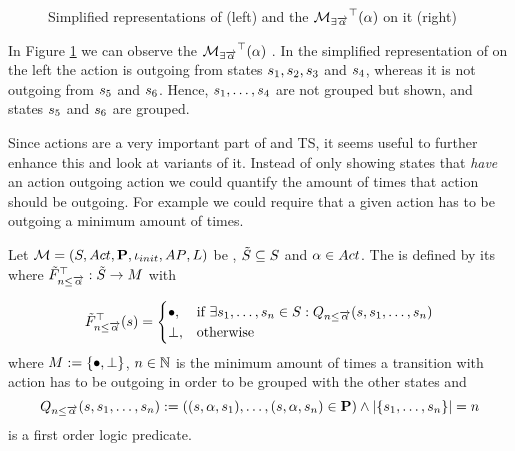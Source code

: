 \documentclass[preview]{standalone}
\begin{document}
\begin{figure}[!htb]
	\begin{minipage}{.5\textwidth}
		\hspace{5mm}
		
	\end{minipage}%
	\begin{minipage}{.5\textwidth}
		\hspace{5mm}
		
	\end{minipage}
	\caption{Simplified representations of \mdp (left) and the \viewN ${{{{{\mathcal{M}}}}_{{\exists{\overrightarrow{\ensuremath{{\alpha}}}}}}}^{\top}}({\alpha})$ on it (right)}
	\label{fig:outActHasAfter} 
\end{figure}
\begin{exmp}
	In Figure \ref{fig:outActHasAfter} we can observe the \viewN ${{{{{\mathcal{M}}}}_{{\exists{\overrightarrow{\ensuremath{{\alpha}}}}}}}^{\top}}({\alpha})$ \chgph. In the simplified representation of \achgphN on the left the action \action is outgoing from states ${s}_1, {s}_2, {s}_3$ and ${s}_4$, whereas it is not outgoing from ${s}_5$ and ${s}_6$. Hence, ${s}_1, \dots, {s}_4$ are not grouped but shown, and states ${s}_5$ and ${s}_6$ are grouped.
\end{exmp}

Since actions are a very important part of \chgphsN and TS, it seems useful to further enhance this \viewN and look at variants of it. Instead of only showing states that \emph{have} an action outgoing action we could quantify the amount of times that action should be outgoing. For example we could require that a given action has to be outgoing a minimum amount of times. 

\begin{definition}	
	Let ${{{\mathcal{M}}}} = {{({S}, {Act}, {\textbf{P}}, {\iota_{init}}, {AP}, {L})}}$ be \achgphN, ${\tilde{{S}}} \subseteq {S}$ and ${\alpha} \in {Act}$. The \viewN \viewminoutaction is defined by its \grpfctN \gfctminoutaction where ${{\tilde{F}_{{{n}\leq{\overrightarrow{\ensuremath{{\alpha}}}}}}}^{\top}} : {\tilde{{S}}} \to {\ensuremath{{M}}}$ with

	\[
	{{\tilde{F}_{{{n}\leq{\overrightarrow{\ensuremath{{\alpha}}}}}}}^{\top}}({s}) =
	\begin{cases}
			{\bullet},				& \text{if } \exists {s}_1, \dots, {s}_{n} \in {S}: {Q_{{n}\leq{\overrightarrow{\ensuremath{{\alpha}}}}}({s},{s}_1, \dots, {s}_{{n}})}\\
			{\bot},     	& \text{otherwise}
		\end{cases}
	\]
	where ${{M}} := {\{{\bullet}, {\bot}\}}$,
	 ${n} \in {\mathbb{N}}$ is the minimum amount of times a transition with action \action has to be outgoing in order to be grouped with the other states and
	\[
	{Q_{{n}\leq{\overrightarrow{\ensuremath{{\alpha}}}}}({s},{s}_1, \dots, {s}_{{n}})} := (({s}, {\alpha}, {s}_1), \dots, ({s}, {\alpha}, {s}_{n}) \in {\ensuremath{{\textbf{P}}}}) \land |\{{s}_1, \dots, {s}_{n}\}| = {n}
	\]
	is a first order logic predicate.
	\label{def:minoutaction}
\end{definition}
\end{document}
